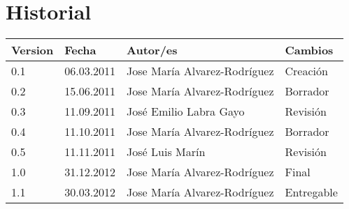 \chapter*{Historial}
\thispagestyle{empty}

\begin{tabular}{|p{1.3cm}|p{2cm}|p{7cm}|p{3cm}|}  \hline
Version & Fecha & Autor/es & Cambios \\ \hline \hline

0.1 & 06.03.2011 & Jose María Alvarez-Rodríguez & Creación  \\
0.2 & 15.06.2011 & Jose María Alvarez-Rodríguez& Borrador \\
0.3 & 11.09.2011 & José Emilio Labra Gayo & Revisión \\
0.4 & 11.10.2011 & Jose María Alvarez-Rodríguez& Borrador \\
0.5 & 11.11.2011 & José Luis Marín & Revisión \\
1.0 & 31.12.2012 & Jose María Alvarez-Rodríguez & Final \\
1.1 & 30.03.2012 & Jose María Alvarez-Rodríguez & Entregable \\

\hline
\end{tabular}
